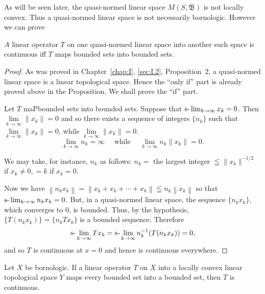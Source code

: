\begin{remarku} As will be seen later, the quasi-normed linear space $M(S, \mathfrak{B})$ is not locally convex. Thus a quasi-normed linear space is not necessarily bornologic. However we can prove 
\end{remarku}

\begin{theorem}\label{thm:I.7.Theorem.2} $A$ linear operator $T$ on one quasi-normed linear space into another such space is continuous iff $T$ maps bounded sets into bounded sets. 
\end{theorem}

\begin{proof}
 As was proved in Chapter~\ref{chap:I}, \ref{sec:I.2}, Proposition~\hyperref[prop:I.2.Proposition.2]{$2$}, a quasi-normed linear space is a linear topological space. Hence the ``only if'' part is already proved above in the Proposition. We shall prove the ``if'' part. 

Let $T$ maPbounded sets into bounded sets. Suppose that $\text{s-}\lim\nolimits_{k\to \infty}x_k = 0$. Then $\lim\limits_{k\to \infty}\| x_k\| = 0$ and so there exists a sequence of integers $\{n_k\}$ such that $\lim\limits_{k\to \infty}\| x_k\| = 0$, while $\lim\limits_{k\to \infty}\| x_k\| = 0$. 
\[
\lim\limits_{k \rightarrow \infty} n_{k} = \infty \quad \text{ while } \quad \lim\limits_{k \rightarrow \infty} n_{k} \| x_{k} \| = 0.
\]

We may take, for instance, $n_k$ as follows: 
$n_{k}  =$ the largest integer $\leqq \| x_{k} \| ^{-1/2}$ if $x_{k} \neq 0, = k$ if $x_{k} = 0.$


Now we have $\left\|n_{k}x_{k}\right\|=\left\|x_{k}+x_{k}+\cdots+x_{k}\right\|\leqq n_{k}\left\|x_{k}\right\|$ so that $\text{s-}\lim\nolimits_{k\to\infty}n_{k}x_{k}=0$. But, in a quasi-normed linear space, the sequence $\{n_{k}x_{k}\}$, which converges to $0$, is bounded. Thus, by the hypothesis, $\{T(n_{k}x_{k})\}=\{n_{k}Tx_{k}\}$ is a bounded sequence. Therefore 
\[
\text{s-}\lim_{k \to \infty} T x_{k} = \text{s-}\lim_{k \to \infty} n_{k} ^{-1} (T (n_{k} x_{k})) = 0,
\]
and so $T$ is continuous at $x = 0$ and hence is continuous everywhere. 
\end{proof}

\begin{theorem}\label{thm:I.7.Theorem.3} Let $X$ be bornologic. If a linear operator $T$ on $X$ into a locally convex linear topological space $Y$ maps every bounded set into a bounded set, then $T$ is continuous. 
\end{theorem}


